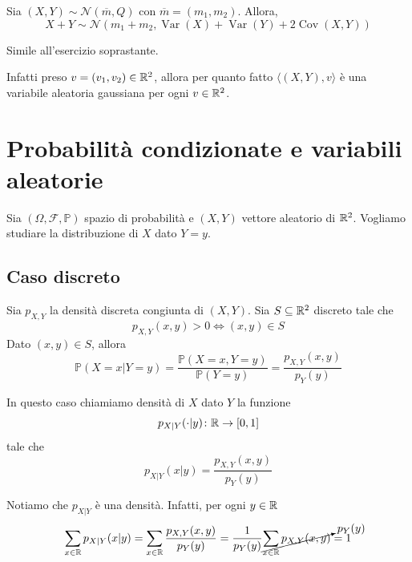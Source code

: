 \documentclass[a4paper]{article}
\begin{document}
\begin{snippetproposition}{}
    Sia \((X,Y) \sim \mathcal N(\overline m, Q)\) con \(\overline m = (m_1, m_2)\).
    Allora, \[
        X + Y \sim \mathcal N(m_1 + m_2,
            \operatorname{Var}(X) + \operatorname{Var}(Y)
            + 2\operatorname{Cov}(X,Y)
        )
    \]
\end{snippetproposition}

\begin{snippetproof}{}
    Simile all'esercizio soprastante.
\end{snippetproof}

Infatti preso \(v = (v_1, v_2) \in \mathbb{R}^2\), allora per quanto fatto
\(\langle (X,Y) , v \rangle\) è una variabile aleatoria gaussiana per ogni \(v \in \mathbb{R}^2\).

\section{Probabilità condizionate e variabili aleatorie}

Sia \((\Omega, \mathcal F, \mathbb P)\) spazio di probabilità e \((X,Y)\)
vettore aleatorio di \(\mathbb{R}^2\).
Vogliamo studiare la distribuzione di \(X\) dato \(Y=y\).

\subsection{Caso discreto}

Sia \(p_{X,Y}\) la densità discreta congiunta di
\((X,Y)\). Sia \(S \subseteq \mathbb{R}^2\) discreto tale che
\[
    p_{X,Y}(x,y)> 0 \iff (x,y) \in S
\]
Dato \((x,y) \in S\), allora
\[
    \mathbb P(X=x | Y=y) = \frac{
        \mathbb P(X=x, Y=y)
    }{
        \mathbb P(Y=y)
    } = \frac{p_{X,Y}(x,y)}{
        p_Y(y)
    }
\]

\begin{snippetdefinition}{}
    In questo caso chiamiamo densità di \(X\) dato \(Y\) la funzione
    \[
        p_{X|Y}(\cdot|y) \colon \mathbb{R} \to [0,1]
    \]
    tale che \[
        p_{X|Y}(x|y) = \frac{
            p_{X,Y}(x,y)
        }{
            p_Y(y)
        }
    \]
\end{snippetdefinition}

Notiamo che \(p_{X|Y}\) è una densità. Infatti, per ogni \(y \in \mathbb{R}\)
\[
    \sum_{x\in \mathbb{R}} p_{X|Y}(x|y)
    = \sum_{x\in \mathbb{R}} \frac{p_{X,Y}(x,y)}{p_Y(y)}
    = \frac{1}{p_Y(y)} \cancelto{p_Y(y)}{
        \sum_{x \in \mathbb{R}} p_{X,Y}(x,y)
    } = 1
\]
\end{document}
